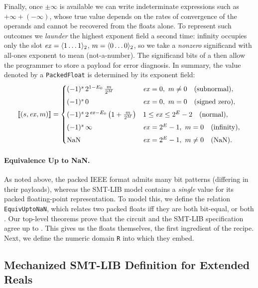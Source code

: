 Finally, once $\pm\infty$ is available we can write indeterminate expressions such as $+\infty + (-\infty)$, whose true value depends on the rates of convergence of the operands and cannot be recovered from the floats alone.
To represent such outcomes we \emph{launder} the highest exponent field a second time: infinity occupies only the slot $\mathit{ex} = \langle 1 \dots 1 \rangle_{2}$, $m = \langle 0 \dots 0 \rangle_{2}$, so we take a \emph{nonzero} significand with all-ones exponent to mean \nan{} (not-a-number).
The significand bits of a \nan{} then allow the programmer to store a payload for error diagnosis.
In summary, the value denoted by a \texttt{PackedFloat} is determined by its exponent field:
\begin{equation}
\llbracket (s, \mathit{ex}, m) \rrbracket =
\begin{cases}
(-1)^s\, 2^{1 - E_0}\,\frac{m}{2^M} & \mathit{ex} = 0,\ m \ne 0 \quad\text{(subnormal)},\\[4pt]
(-1)^s\, 0 & \mathit{ex} = 0,\ m = 0 \quad\text{(signed zero)},\\[4pt]
(-1)^s\, 2^{\,\mathit{ex} - E_0}\left(1 + \frac{m}{2^M}\right) & 1 \le \mathit{ex} \le 2^E - 2 \quad\text{(normal)},\\[4pt]
(-1)^s\, \infty & \mathit{ex} = 2^E - 1,\ m = 0 \quad\text{(infinity)},\\[4pt]
\mathrm{NaN} & \mathit{ex} = 2^E - 1,\ m \ne 0 \quad\text{(NaN)}.
\end{cases}
\end{equation}

\paragraph{Equivalence Up to NaN.}
As noted above, the packed IEEE format admits many \nan{} bit patterns (differing in their payloads),
whereas the SMT-LIB model contains a \emph{single} \nan{} value for its packed floating-point representation.
To model this, we define the relation \texttt{EquivUptoNaN},
which relates two packed floats iff they are both bit-equal, or both \nan{}.
Our top-level theorems prove that the circuit and the SMT-LIB specification agree up to \nan{}.
This gives us the floats themselves, the first ingredient of the recipe.
Next, we define the numeric domain \texttt{R} into which they embed.

\subsection{Mechanized SMT-LIB Definition for Extended Reals}\label{sec:fp:domain}

